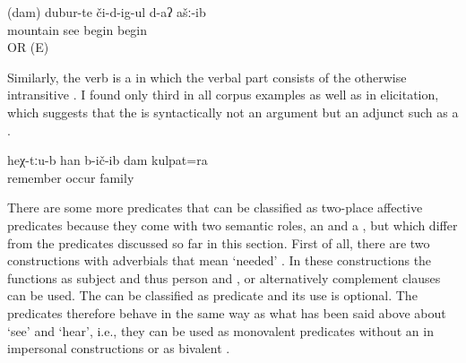 \begin{exe}
	\ex	\label{ex:‎I began to see the mountains2}
	\gll	(dam)	dubur-te	či-d-ig-ul	d-aʔ	ašː-ib\\
			mountain	see	begin	begin\\
	\glt	{} OR  (E)
\end{exe}


Similarly, the verb  is a  in which the verbal part consists of the otherwise intransitive   . I found only third  in all corpus examples as well as in elicitation, which suggests that the   is syntactically not an argument but an adjunct such as a  . 
%
\begin{exe}
	\ex	\label{ex:There I also remembered my family remember}
	\gll	heχ-tːu-b	han	b-ič-ib	dam	kulpat=ra\\
			remember	occur		family\\
	\glt	{}
\end{exe}


There are some more predicates that can be classified as two-place affective predicates because they come with two semantic roles, an  and a , but which differ from the predicates discussed so far in this section. First of all, there are two  constructions with adverbials that mean `needed' . In these constructions the   functions as  subject and thus person and   , or alternatively complement clauses can be used. The  can be classified as  predicate and its use is optional. The predicates therefore behave in the same way as what has been said above about `see' and `hear', i.e., they can be used as monovalent predicates without an  in impersonal constructions or as bivalent .


